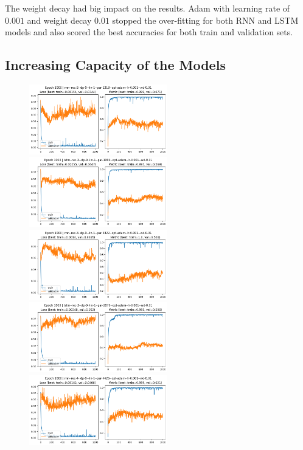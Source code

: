 \documentclass[a4paper,10pt]{article}
\begin{document}
The weight decay had big impact on the results. Adam with learning rate of $0.001$ and weight decay $0.01$ stopped the over-fitting for both RNN and LSTM models and also scored the best accuracies for both train and validation sets.

\subsection{Increasing Capacity of the Models}


\begin{figure}[H]
      \begin{center}
            \includegraphics[width=6cm]{figures/rnn--rec-2--dp-0--lin-1--par-2218--opt-adam--lr-0.001--wd-0.01--e-1000.png}
            \includegraphics[width=6cm]{figures/lstm--rec-2--dp-0--lin-1--par-1990--opt-adam--lr-0.001--wd-0.01--e-1000.png}
            \includegraphics[width=6cm]{figures/rnn--rec-3--dp-0--lin-1--par-3322--opt-adam--lr-0.001--wd-0.01--e-1000.png}
            \includegraphics[width=6cm]{figures/lstm--rec-3--dp-0--lin-1--par-2870--opt-adam--lr-0.001--wd-0.01--e-1000.png}
            \includegraphics[width=6cm]{figures/rnn--rec-4--dp-0--lin-1--par-4426--opt-adam--lr-0.001--wd-0.01--e-1000.png}

\end{center}
\end{figure}
\end{document}
